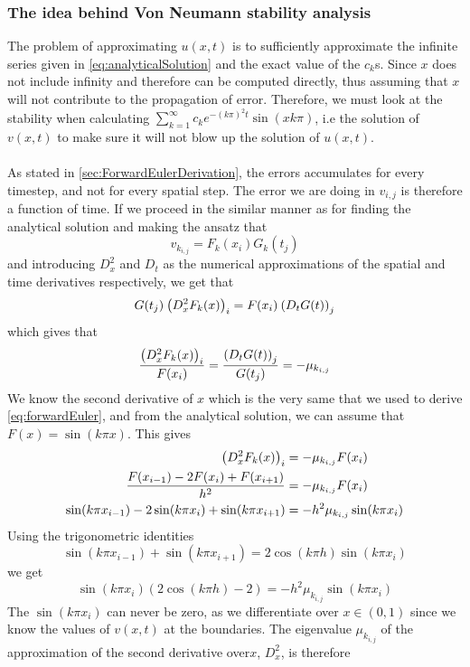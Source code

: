 \documentclass[12pt,english,a4paper]{article}
\begin{document}
\subsubsection{The idea behind Von Neumann stability analysis}
The problem of approximating \(u(x,t)\) is to sufficiently approximate the infinite series given in \vref{eq:analyticalSolution} and the exact value of the \(c_k\)s. Since \( x\) does not include infinity and therefore can be computed directly, thus assuming that \(x\) will not contribute to the propagation of error. Therefore, we must look at the stability when calculating \( \sum_{k=1}^\infty c_ke^{-(k\pi)^2t}\sin(xk\pi) \), i.e the solution of \(v(x,t)\) to make sure it will not blow up the solution of \(u(x,t)\). \\ \\
As stated in \vref{sec:ForwardEulerDerivation}, the errors accumulates for every timestep, and not for every spatial step. The error we are doing in \(v_{i,j}\) is therefore a function of time. 
If we proceed in the similar manner as for finding the analytical solution and making the ansatz that
\[
v_{k_{i,j}} = F_k(x_i)G_k(t_j)
\]
and introducing \(D_x^2\) and \(D_t\) as the numerical approximations of the spatial and time derivatives respectively, we get that
\[
G(t_j)\:\qty(D_x^2F_k(x))_i = F(x_i)\:\qty(D_tG(t))_j
\]
which gives that 
\begin{equation}\label{eq:discreteRatios}
\frac{\qty(D_x^2F_k(x))_i }{ F(x_i)} = \frac{\qty(D_tG(t))_j}{G(t_j)} = -\mu_{k_{i,j}}
\end{equation}
We know the second derivative of \(x\) which is the very same that we used to derive \vref{eq:forwardEuler}, and from the analytical solution, we can assume that \(F(x) = \sin(k \pi x)\). This gives
\begin{align*}
\qty(D_x^2F_k(x))_i &= -\mu_{k_{i,j}}F(x_i) \\
\frac{F(x_{i-1}) -2F(x_i) + F(x_{i+1}) }{h^2} &= -\mu_{k_{i,j}}F(x_i) \\
\sin(k\pi x_{i-1}) -2\sin(k\pi x_i) + \sin(k \pi x_{i+1}) &= -h^2\mu_{k_{i,j}}\sin(k \pi x_i) 
\end{align*}
Using the trigonometric identities
\[
\sin(k\pi x_{i-1}) + \sin(k\pi x_{i+1}) = 2\cos(k\pi h)\sin(k\pi x_i)
\]
we get
\[
\sin(k\pi x_i)(2\cos(k\pi h) - 2) = -h^2\mu_{k_{i,j}}\sin(k \pi x_i) 
\]
The \(\sin(k\pi x_i) \) can never be zero, as we differentiate over \(x \in (0,1) \) since we know the values of \( v(x,t) \) at the boundaries. The eigenvalue \(\mu_{k_{i,j}}\) of the approximation of the second derivative over\(x \), \( D_x^2 \), is therefore
\end{document}
